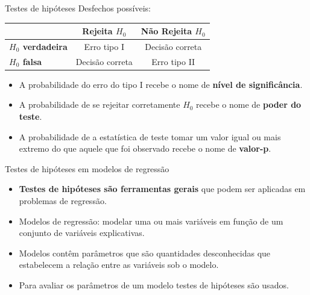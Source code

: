 \documentclass[
  ignorenonframetext,
  serif,
  professionalfont,
  usenames,
  dvipsnames,
  aspectratio = 169]{beamer}
\begin{document}
\begin{frame}{Testes de hipóteses}
\protect\hypertarget{testes-de-hipuxf3teses-3}{}
Desfechos possíveis:

\begin{table}[]
\begin{tabular}{l|cc}
\hline
\multicolumn{1}{c|}{}    & \textbf{Rejeita $H_0$} & \textbf{Não Rejeita $H_0$} \\ \hline
\textbf{$H_0$ verdadeira} & Erro tipo I           & Decisão correta           \\
\textbf{$H_0$ falsa}      & Decisão correta       & Erro tipo II              \\ \hline
\end{tabular}
\label{tab:my-table}
\end{table}

\begin{itemize}
    \itemsep 2ex
  
  \item A probabilidade do erro do tipo I recebe o nome de \textbf{nível de significância}.
  
  \item A probabilidade de se rejeitar corretamente $H_0$ recebe o nome de \textbf{poder do teste}.
  
  \item A probabilidade de a estatística de teste tomar um valor igual ou mais extremo do que aquele que foi observado recebe o nome de \textbf{valor-p}.
    
  \end{itemize}
\end{frame}

\begin{frame}{Testes de hipóteses em modelos de regressão}
\protect\hypertarget{testes-de-hipuxf3teses-em-modelos-de-regressuxe3o-2}{}
\begin{itemize}
  \itemsep 2ex

  \item \textbf{Testes de hipóteses são ferramentas gerais} que podem ser aplicadas em problemas de regressão.
  
  \item Modelos de regressão: modelar uma ou mais variáveis em função de um conjunto de variáveis explicativas. 

  \item Modelos contêm parâmetros que são quantidades desconhecidas que estabelecem a relação entre as variáveis sob o modelo. 

  \item Para avaliar os parâmetros de um modelo testes de hipóteses são usados.

\end{itemize}
\end{frame}
\end{document}
